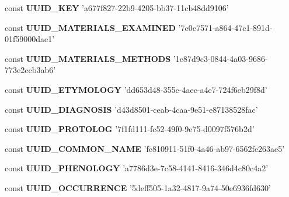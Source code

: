 \begin{DoxyCompactItemize}
\item 
\hypertarget{uuids_8php_a8f8a2e88948ec961f75190548c3f7bf7}{const {\bfseries U\-U\-I\-D\-\_\-\-K\-E\-Y} 'a677f827-\/22b9-\/4205-\/bb37-\/11cb48dd9106'}\label{uuids_8php_a8f8a2e88948ec961f75190548c3f7bf7}

\item 
\hypertarget{uuids_8php_a8345b345927932842bc0b75da4f6435a}{const {\bfseries U\-U\-I\-D\-\_\-\-M\-A\-T\-E\-R\-I\-A\-L\-S\-\_\-\-E\-X\-A\-M\-I\-N\-E\-D} '7c0c7571-\/a864-\/47c1-\/891d-\/01f59000dae1'}\label{uuids_8php_a8345b345927932842bc0b75da4f6435a}

\item 
\hypertarget{uuids_8php_ab05c9f9c753f408d551e877a93c94828}{const {\bfseries U\-U\-I\-D\-\_\-\-M\-A\-T\-E\-R\-I\-A\-L\-S\-\_\-\-M\-E\-T\-H\-O\-D\-S} '1e87d9c3-\/0844-\/4a03-\/9686-\/773e2ccb3ab6'}\label{uuids_8php_ab05c9f9c753f408d551e877a93c94828}

\item 
\hypertarget{uuids_8php_a49886afdae50eb74aa7c1b221032a780}{const {\bfseries U\-U\-I\-D\-\_\-\-E\-T\-Y\-M\-O\-L\-O\-G\-Y} 'dd653d48-\/355c-\/4aec-\/a4e7-\/724f6eb29f8d'}\label{uuids_8php_a49886afdae50eb74aa7c1b221032a780}

\item 
\hypertarget{uuids_8php_a215bf42ba6c9325d17b89fa6fefcc470}{const {\bfseries U\-U\-I\-D\-\_\-\-D\-I\-A\-G\-N\-O\-S\-I\-S} 'd43d8501-\/ceab-\/4caa-\/9e51-\/e87138528fac'}\label{uuids_8php_a215bf42ba6c9325d17b89fa6fefcc470}

\item 
\hypertarget{uuids_8php_af29127479c8ba68a96d7ff809987d824}{const {\bfseries U\-U\-I\-D\-\_\-\-P\-R\-O\-T\-O\-L\-O\-G} '7f1fd111-\/fc52-\/49f0-\/9e75-\/d0097f576b2d'}\label{uuids_8php_af29127479c8ba68a96d7ff809987d824}

\item 
\hypertarget{uuids_8php_a987468d20f308e49c383b2b624112d41}{const {\bfseries U\-U\-I\-D\-\_\-\-C\-O\-M\-M\-O\-N\-\_\-\-N\-A\-M\-E} 'fc810911-\/51f0-\/4a46-\/ab97-\/6562fe263ae5'}\label{uuids_8php_a987468d20f308e49c383b2b624112d41}

\item 
\hypertarget{uuids_8php_a02259ad90854a58738d04e25d4ff0cea}{const {\bfseries U\-U\-I\-D\-\_\-\-P\-H\-E\-N\-O\-L\-O\-G\-Y} 'a7786d3e-\/7c58-\/4141-\/8416-\/346d4c80c4a2'}\label{uuids_8php_a02259ad90854a58738d04e25d4ff0cea}

\item 
\hypertarget{uuids_8php_af024751357865a838fda8666d9d0464d}{const {\bfseries U\-U\-I\-D\-\_\-\-O\-C\-C\-U\-R\-R\-E\-N\-C\-E} '5deff505-\/1a32-\/4817-\/9a74-\/50e6936fd630'}\label{uuids_8php_af024751357865a838fda8666d9d0464d}


\end{DoxyCompactItemize}
